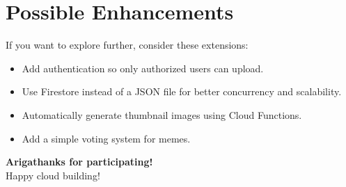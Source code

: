 \documentclass[12pt,a4paper]{article}
\begin{document}
\section{Possible Enhancements}
If you want to explore further, consider these extensions:
\begin{itemize}
    \item Add authentication so only authorized users can upload.
    \item Use Firestore instead of a JSON file for better concurrency and scalability.
    \item Automatically generate thumbnail images using Cloud Functions.
    \item Add a simple voting system for memes.
\end{itemize}

\vspace{1cm}
\begin{center}
\textbf{Arigathanks for participating!} \\
Happy cloud building!
\end{center}
\end{document}
